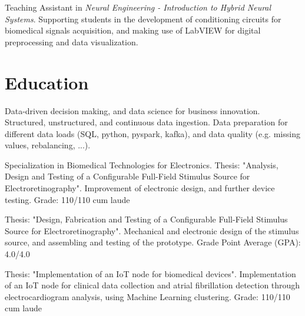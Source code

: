 \documentclass[doublesided,
                paper=a4,
               fontsize=10pt
              ]{my_resume}
\begin{document}
{    
    \small{Teaching Assistant in \textit{Neural Engineering - Introduction to Hybrid Neural Systems}. Supporting students in the development of conditioning circuits for biomedical signals acquisition, and making use of LabVIEW for digital preprocessing and data visualization.}
    
    \vspace{6pt}
    
    \section{Education}
    
    \small{Data-driven decision making, and data science for business innovation. Structured, unstructured, and continuous data ingestion. Data preparation for different data loads (SQL, python, pyspark, kafka), and data quality (e.g. missing values, rebalancing, ...).}

    \vspace{-1pt}
    {\color{highlightbarcolor}{\rule{\linewidth}{1.0pt}}}

    \small{Specialization in Biomedical Technologies for Electronics. Thesis: "Analysis, Design and Testing of a Configurable Full-Field Stimulus Source for Electroretinography". Improvement of electronic design, and further device testing. Grade: 110/110 cum laude}

    \vspace{-1pt}
    {\color{highlightbarcolor}{\rule{\linewidth}{1.0pt}}}

    \small{Thesis: "Design, Fabrication and Testing of a Configurable Full-Field Stimulus Source for Electroretinography". Mechanical and electronic design of the stimulus source, and assembling and testing of the prototype. Grade Point Average (GPA): 4.0/4.0}

    \vspace{-1pt}
    {\color{highlightbarcolor}{\rule{\linewidth}{1.0pt}}}
    
    \small{Thesis: "Implementation of an IoT node for biomedical devices". Implementation of an IoT node for clinical data collection and atrial fibrillation detection through electrocardiogram analysis, using Machine Learning clustering. Grade: 110/110 cum laude}

}
\end{document}
